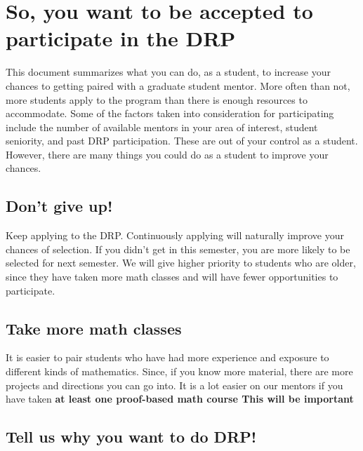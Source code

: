 \documentclass{article}
\begin{document}
\section{So, you want to be accepted to participate in the DRP}

This document summarizes what you can do, as a student, to increase your chances to getting paired
with a graduate student mentor. More often than not, more students apply to the program than there
is enough resources to accommodate. Some of the factors taken into consideration for participating
include the number of available mentors in your area of interest, student seniority, and past DRP
participation. These are out of your control as a student. However, there are many things you could
do as a student to improve your chances.


\subsection{Don't give up!}

Keep applying to the DRP. Continuously applying will naturally improve your chances of selection. If
you didn't get in this semester, you are more likely to be selected for next semester. We will give
higher priority to students who are older, since they have taken more math classes and will have
fewer opportunities to participate. 

\subsection{Take more math classes}

It is easier to pair students who have had more experience and exposure to different kinds of
mathematics. Since, if you know more material, there are more projects and directions you can go
into. It is a lot easier on our mentors if you have taken \bf{at least one proof-based math course} 
This will be important 

\subsection{Tell us why you want to do DRP!}
\end{document}
